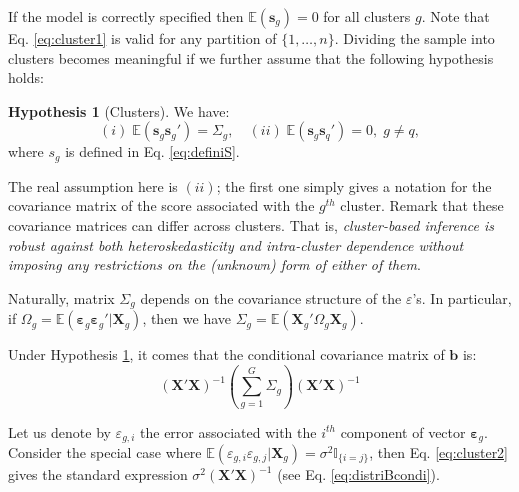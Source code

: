 \documentclass[
  12pt,
]{book}
\theoremstyle{definition}
\theoremstyle{definition}
\theoremstyle{definition}
\theoremstyle{definition}
\newtheorem{hypothesis}{Hypothesis}[chapter]
\theoremstyle{remark}
\begin{document}
If the model is correctly specified then \(\mathbb{E}(\mathbf{s}_g)=0\) for all clusters \(g\). Note that Eq. \eqref{eq:cluster1} is valid for any partition of \(\{1,\dots,n\}\). Dividing the sample into clusters becomes meaningful if we further assume that the following hypothesis holds:

\begin{hypothesis}[Clusters]
\protect\hypertarget{hyp:cluster}{}\label{hyp:cluster}We have:
\[
(i)\; \mathbb{E}(\mathbf{s}_g\mathbf{s}_g')=\Sigma_g,\quad (ii)\; \mathbb{E}(\mathbf{s}_g\mathbf{s}_q')=0,\;g \ne q,
\]
where \(s_g\) is defined in Eq. \eqref{eq:definiS}.
\end{hypothesis}

The real assumption here is \((ii)\); the first one simply gives a notation for the covariance matrix of the score associated with the \(g^{th}\) cluster. Remark that these covariance matrices can differ across clusters. That is, \emph{cluster-based inference is robust against both heteroskedasticity and intra-cluster dependence without imposing any restrictions on the (unknown) form of either of them}.

Naturally, matrix \(\Sigma_g\) depends on the covariance structure of the \(\varepsilon\)'s. In particular, if \(\Omega_g = \mathbb{E}(\boldsymbol\varepsilon_g\boldsymbol\varepsilon_g'|\mathbf{X}_g)\), then we have \(\Sigma_g = \mathbb{E}(\mathbf{X}_g'\Omega_g\mathbf{X}_g)\).

Under Hypothesis \ref{hyp:cluster}, it comes that the conditional covariance matrix of \(\mathbf{b}\) is:
\begin{equation}
\left(\mathbf{X}'\mathbf{X}\right)^{-1}\left(\sum_{g=1}^G \Sigma_g\right)\left(\mathbf{X}'\mathbf{X}\right)^{-1}\label{eq:cluster2}
\end{equation}

Let us denote by \(\varepsilon_{g,i}\) the error associated with the \(i^{th}\) component of vector \(\boldsymbol\varepsilon_g\). Consider the special case where \(\mathbb{E}(\varepsilon_{g,i} \varepsilon_{g,j}|\mathbf{X}_g)=\sigma^2\mathbb{I}_{\{i=j\}}\), then Eq. \eqref{eq:cluster2} gives the standard expression \(\sigma^2\left(\mathbf{X}'\mathbf{X}\right)^{-1}\) (see Eq. \eqref{eq:distriBcondi}).
\end{document}

